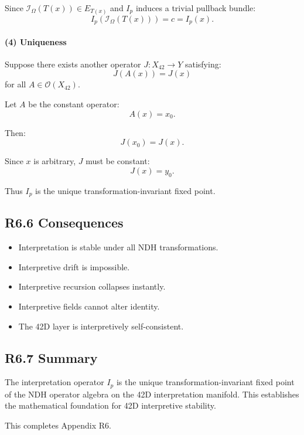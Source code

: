 Since $\mathcal{I}_{\Omega}(T(x)) \in E_{T(x)}$ and $I_p$ induces a
trivial pullback bundle:
\[
I_p(\mathcal{I}_{\Omega}(T(x))) = c = I_p(x).
\]

\paragraph{(4) Uniqueness}

Suppose there exists another operator $J : X_{42} \to Y$ satisfying:
\[
J(A(x)) = J(x)
\]
for all $A \in \mathcal{O}(X_{42})$.

Let $A$ be the constant operator:
\[
A(x) = x_0.
\]

Then:
\[
J(x_0) = J(x).
\]

Since $x$ is arbitrary, $J$ must be constant:
\[
J(x) = y_0.
\]

Thus $I_p$ is the unique transformation-invariant fixed point.

\subsection*{R6.6 Consequences}

\begin{itemize}
    \item Interpretation is stable under all NDH transformations.
    \item Interpretive drift is impossible.
    \item Interpretive recursion collapses instantly.
    \item Interpretive fields cannot alter identity.
    \item The 42D layer is interpretively self-consistent.
\end{itemize}

\subsection*{R6.7 Summary}

The interpretation operator $I_p$ is the unique transformation-invariant
fixed point of the NDH operator algebra on the 42D interpretation
manifold. This establishes the mathematical foundation for 42D
interpretive stability.

This completes Appendix R6.

